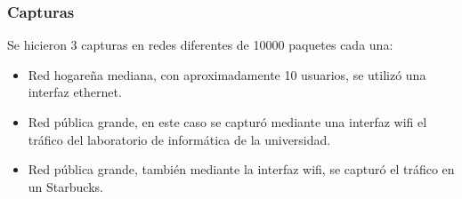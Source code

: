 \subsubsection*{Capturas}
Se hicieron 3 capturas en redes diferentes de 10000 paquetes cada una:
\begin{itemize}
	\item Red hogareña mediana, con aproximadamente 10 usuarios, se utilizó una interfaz ethernet.
	\item Red pública grande, en este caso se capturó mediante una interfaz wifi el tráfico del laboratorio de informática de la universidad.
	\item Red pública grande, también mediante la interfaz wifi, se capturó el tráfico en un Starbucks.
\end{itemize}